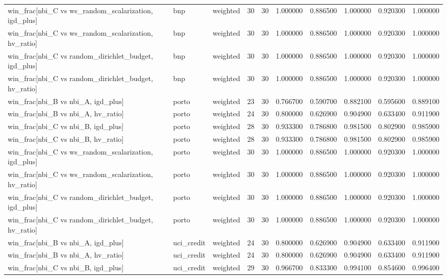 \begin{longtable}{lllrrrrrrr}
win\_frac[nbi\_C vs ws\_random\_scalarization, igd\_plus] & bnp & weighted & 30 & 30 & 1.000000 & 0.886500 & 1.000000 & 0.920300 & 1.000000 \\
win\_frac[nbi\_C vs ws\_random\_scalarization, hv\_ratio] & bnp & weighted & 30 & 30 & 1.000000 & 0.886500 & 1.000000 & 0.920300 & 1.000000 \\
win\_frac[nbi\_C vs random\_dirichlet\_budget, igd\_plus] & bnp & weighted & 30 & 30 & 1.000000 & 0.886500 & 1.000000 & 0.920300 & 1.000000 \\
win\_frac[nbi\_C vs random\_dirichlet\_budget, hv\_ratio] & bnp & weighted & 30 & 30 & 1.000000 & 0.886500 & 1.000000 & 0.920300 & 1.000000 \\
win\_frac[nbi\_B vs nbi\_A, igd\_plus] & porto & weighted & 23 & 30 & 0.766700 & 0.590700 & 0.882100 & 0.595600 & 0.889100 \\
win\_frac[nbi\_B vs nbi\_A, hv\_ratio] & porto & weighted & 24 & 30 & 0.800000 & 0.626900 & 0.904900 & 0.633400 & 0.911900 \\
win\_frac[nbi\_C vs nbi\_B, igd\_plus] & porto & weighted & 28 & 30 & 0.933300 & 0.786800 & 0.981500 & 0.802900 & 0.985900 \\
win\_frac[nbi\_C vs nbi\_B, hv\_ratio] & porto & weighted & 28 & 30 & 0.933300 & 0.786800 & 0.981500 & 0.802900 & 0.985900 \\
win\_frac[nbi\_C vs ws\_random\_scalarization, igd\_plus] & porto & weighted & 30 & 30 & 1.000000 & 0.886500 & 1.000000 & 0.920300 & 1.000000 \\
win\_frac[nbi\_C vs ws\_random\_scalarization, hv\_ratio] & porto & weighted & 30 & 30 & 1.000000 & 0.886500 & 1.000000 & 0.920300 & 1.000000 \\
win\_frac[nbi\_C vs random\_dirichlet\_budget, igd\_plus] & porto & weighted & 30 & 30 & 1.000000 & 0.886500 & 1.000000 & 0.920300 & 1.000000 \\
win\_frac[nbi\_C vs random\_dirichlet\_budget, hv\_ratio] & porto & weighted & 30 & 30 & 1.000000 & 0.886500 & 1.000000 & 0.920300 & 1.000000 \\
win\_frac[nbi\_B vs nbi\_A, igd\_plus] & uci\_credit & weighted & 24 & 30 & 0.800000 & 0.626900 & 0.904900 & 0.633400 & 0.911900 \\
win\_frac[nbi\_B vs nbi\_A, hv\_ratio] & uci\_credit & weighted & 24 & 30 & 0.800000 & 0.626900 & 0.904900 & 0.633400 & 0.911900 \\
win\_frac[nbi\_C vs nbi\_B, igd\_plus] & uci\_credit & weighted & 29 & 30 & 0.966700 & 0.833300 & 0.994100 & 0.854600 & 0.996400 \\

\end{longtable}
